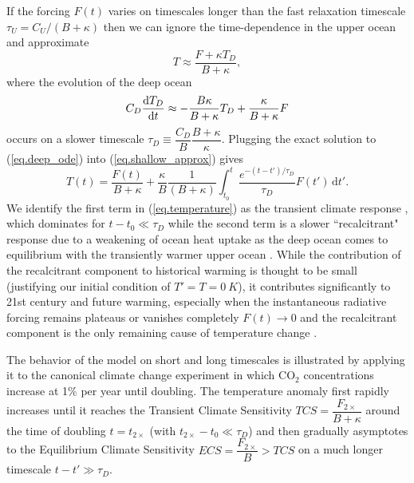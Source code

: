\documentclass{article}
\begin{document}
If the forcing $F(t)$ varies on timescales longer than the fast relaxation timescale $\tau_{U} = C_{U}/(B + \kappa)$ then we can ignore the time-dependence in the upper ocean and approximate
\begin{equation}
    T \approx \frac{F+\kappa T_{D}}{B + \kappa},
    \label{eq.shallow_approx}
\end{equation}
where the evolution of the deep ocean
\begin{equation}
    C_{D} \dv{T_{D}}{t} \approx - \frac{B \kappa}{B + \kappa} T_{D} + \frac{\kappa}{B + \kappa} F
    \label{eq.deep_ode}
\end{equation}
occurs on a slower timescale $\tau_{D} \equiv \dfrac{C_{D}}{B} \dfrac{B + \kappa}{\kappa}$. Plugging the exact solution to (\ref{eq.deep_ode}) into (\ref{eq.shallow_approx}) gives
\begin{equation}
    T(t) = \frac{F(t)}{B + \kappa} + \frac{\kappa}{B} \frac{1}{(B+\kappa)} \int_{t_{0}}^{t} \frac{ e^{-(t-t')/\tau_{D}}}{\tau_{D}} F(t') \, \text{d}t'.\label{eq.temperature}
\end{equation}
We identify the first term in (\ref{eq.temperature}) as the transient climate response \citep{gregory_transient_2008}, which dominates for $t-t_{0} \ll \tau_{D}$ while the second term is a slower ``recalcitrant" response due to a weakening of ocean heat uptake as the deep ocean comes to equilibrium with the transiently warmer upper ocean \citep{held_probing_2010}. While the contribution of the recalcitrant component to historical warming is thought to be small (justifying our initial condition of $T' = T = \SI{0}{K}$), it contributes significantly to 21st century and future warming, especially when the instantaneous radiative forcing remains plateaus or vanishes completely $F(t) \rightarrow 0$ and the recalcitrant component is the only remaining cause of temperature change \citep{gregory_transient_2008, held_probing_2010}.

The behavior of the model on short and long timescales is illustrated by applying it to the canonical climate change experiment in which CO$_{2}$ concentrations increase at 1\% per year until doubling. The temperature anomaly first rapidly increases until it reaches the Transient Climate Sensitivity $TCS = \dfrac{F_{2\times}}{B + \kappa}$ around the time of doubling $t=t_{2\times}$ (with $t_{2\times} - t_{0} \ll \tau_{D}$) and then gradually asymptotes to the Equilibrium Climate Sensitivity $ECS = \dfrac{F_{2\times}}{B} > TCS$ on a much longer timescale $t-t' \gg \tau_{D}$.
\end{document}
